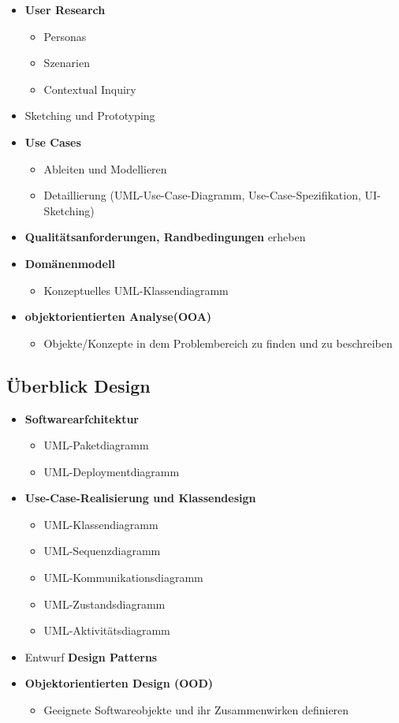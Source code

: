 \documentclass{article}
\begin{document}
\begin{itemize}
	\item \textbf{User Research}
	\begin{itemize}
		\item Personas 
		\item Szenarien
		\item Contextual Inquiry
	\end{itemize}
	\item Sketching und Prototyping
	\item \textbf{Use Cases}
	\begin{itemize}
		\item Ableiten und Modellieren
		\item Detaillierung (UML-Use-Case-Diagramm, Use-Case-Spezifikation, UI-Sketching)
	\end{itemize}
	\item \textbf{Qualitätsanforderungen, Randbedingungen} erheben
	\item \textbf{Domänenmodell}
	\begin{itemize}
		\item Konzeptuelles UML-Klassendiagramm 
	\end{itemize}
	\item \textbf{objektorientierten Analyse(OOA)} 
	\begin{itemize}
		\item Objekte/Konzepte in dem Problembereich zu finden und zu beschreiben
	\end{itemize}
\end{itemize}

\subsection{Überblick Design}
\begin{itemize}
	\item \textbf{Softwarearfchitektur}
	\begin{itemize}
		\item UML-Paketdiagramm
		\item UML-Deploymentdiagramm
	\end{itemize}
	\item \textbf {Use-Case-Realisierung und Klassendesign}
	\begin{itemize}
		\item UML-Klassendiagramm
		\item UML-Sequenzdiagramm
		\item UML-Kommunikationsdiagramm
		\item UML-Zustandsdiagramm
		\item UML-Aktivitätsdiagramm
	\end{itemize}
	\item Entwurf \textbf{Design Patterns}
	\item \textbf{Objektorientierten Design (OOD)}
	\begin{itemize}
		\item Geeignete Softwareobjekte und ihr Zusammenwirken definieren
	\end{itemize}
\end{itemize}
\end{document}
